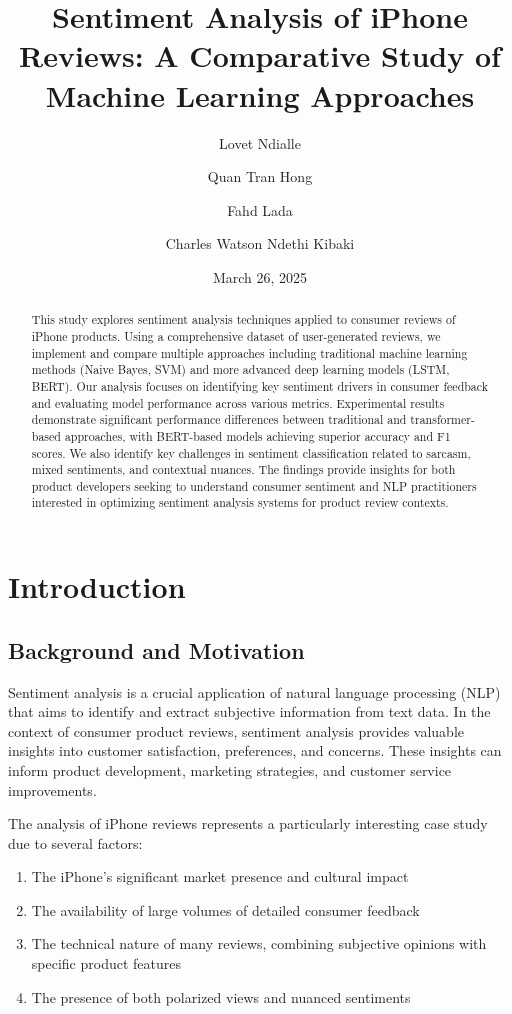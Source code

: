 \documentclass[
]{article}
\title{Sentiment Analysis of iPhone Reviews: A Comparative Study of
Machine Learning Approaches}
\author{Lovet Ndialle \and Quan Tran Hong \and Fahd Lada \and Charles
Watson Ndethi Kibaki}
\date{March 26, 2025}
\providecommand{\tightlist}{%
  \setlength{\itemsep}{0pt}\setlength{\parskip}{0pt}}\usepackage{longtable,booktabs,array}
\begin{document}
\maketitle
\begin{abstract}
This study explores sentiment analysis techniques applied to consumer
reviews of iPhone products. Using a comprehensive dataset of
user-generated reviews, we implement and compare multiple approaches
including traditional machine learning methods (Naive Bayes, SVM) and
more advanced deep learning models (LSTM, BERT). Our analysis focuses on
identifying key sentiment drivers in consumer feedback and evaluating
model performance across various metrics. Experimental results
demonstrate significant performance differences between traditional and
transformer-based approaches, with BERT-based models achieving superior
accuracy and F1 scores. We also identify key challenges in sentiment
classification related to sarcasm, mixed sentiments, and contextual
nuances. The findings provide insights for both product developers
seeking to understand consumer sentiment and NLP practitioners
interested in optimizing sentiment analysis systems for product review
contexts.
\end{abstract}


\section{Introduction}\label{introduction}

\subsection{Background and Motivation}\label{background-and-motivation}

Sentiment analysis is a crucial application of natural language
processing (NLP) that aims to identify and extract subjective
information from text data. In the context of consumer product reviews,
sentiment analysis provides valuable insights into customer
satisfaction, preferences, and concerns. These insights can inform
product development, marketing strategies, and customer service
improvements.

The analysis of iPhone reviews represents a particularly interesting
case study due to several factors:

\begin{enumerate}
\def\labelenumi{\arabic{enumi}.}
\tightlist
\item
  The iPhone's significant market presence and cultural impact
\item
  The availability of large volumes of detailed consumer feedback
\item
  The technical nature of many reviews, combining subjective opinions
  with specific product features
\item
  The presence of both polarized views and nuanced sentiments
\end{enumerate}
\end{document}
